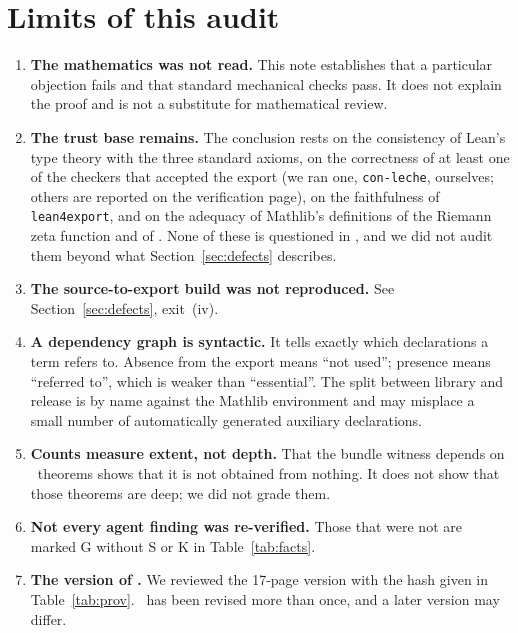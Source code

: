 \section{Limits of this audit}
\label{sec:limits}

\begin{enumerate}
\item \textbf{The mathematics was not read.} This note establishes that a particular objection fails and that standard mechanical checks pass. It does not explain the proof and is not a substitute for mathematical review.
\item \textbf{The trust base remains.} The conclusion rests on the consistency of Lean's type theory with the three standard axioms, on the correctness of at least one of the checkers that accepted the export
(we ran one, \texttt{con-leche}, ourselves; others are reported on the verification page), on the faithfulness of \texttt{lean4export}, and on the adequacy of Mathlib's definitions of the Riemann zeta function and of .
None of these is questioned in \N, and we did not audit them beyond what Section~\ref{sec:defects} describes.
\item \textbf{The source-to-export build was not reproduced.} See Section~\ref{sec:defects}, exit~(iv).
\item \textbf{A dependency graph is syntactic.} It tells exactly which declarations a term refers to. Absence from the export means ``not used''; presence means ``referred to'', which is weaker than ``essential''.
The split between library and release is by name against the Mathlib environment and may misplace a small number of automatically generated auxiliary declarations.
\item \textbf{Counts measure extent, not depth.} That the bundle witness depends on \NpackageThm\ theorems shows that it is not obtained from nothing. It does not show that those theorems are deep; we did not grade them.
\item \textbf{Not every agent finding was re-verified.} Those that were not are marked \textsf{G} without \textsf{S} or \textsf{K} in Table~\ref{tab:facts}.
\item \textbf{The version of \N.} We reviewed the 17-page version with the hash given in Table~\ref{tab:prov}. \N\ has been revised more than once, and a later version may differ.
\end{enumerate}
